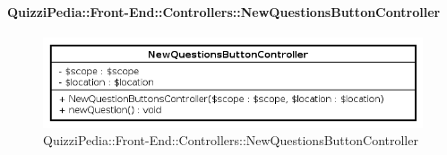 \paragraph[QuizziPedia::Front-End::Controllers\\::NewQuestionsButtonController]{QuizziPedia::Front-End::Controllers::NewQuestionsButtonController}
\begin{figure} [ht]
	\centering
	\includegraphics[scale=0.8]{UML/Classi/Front-End/QuizziPedia_Front-end_Controller_NewQuestionsButtonController.png}
	\caption{QuizziPedia::Front-End::Controllers::NewQuestionsButtonController}
\end{figure} \FloatBarrier
